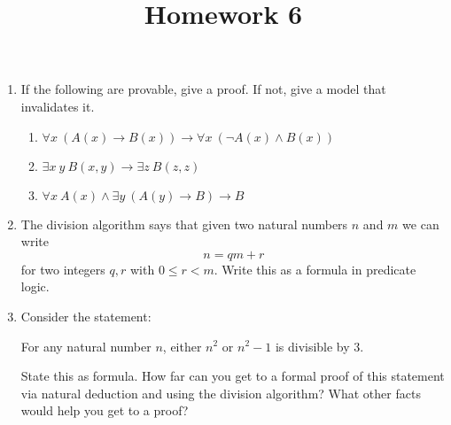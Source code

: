 \documentclass[12pt]{amsart}
\theoremstyle{definition}
\begin{document}
\title{Homework 6}

\maketitle

\begin{enumerate}
	\item If the following are provable, give a proof. If not, give a model that invalidates it. 
	\begin{enumerate}
		\item $\displaystyle{\forall x~ (A(x) \to B(x)) \to \forall x~ (\neg A(x) \land B(x))}$
		\item $\displaystyle{\exists x~y~ B(x,y) \to \exists z~ B(z,z)}$
		\item $\displaystyle{\forall x~ A(x) \land \exists y~ (A(y) \to B) \to B}$
	\end{enumerate}
	\item The division algorithm says that given two natural numbers $n$ and $m$ we can write 
		\begin{displaymath}
			n = qm + r
		\end{displaymath}
		for two integers $q,r$ with $0 \leq r < m$. Write this as a formula in predicate logic. 
	\item Consider the statement:
	\begin{center}
		For any natural number $n$, either $n^2$ or $n^2 - 1$ is divisible by $3$. 
	\end{center}
	State this as formula. How far can you get to a formal proof of this statement via 
	natural deduction and using the division algorithm? What other facts would help you 
	get to a proof?
\end{enumerate}
\end{document}
